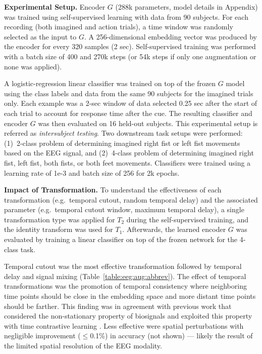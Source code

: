 \documentclass{article}
\renewcommand{\paragraph}[1]{\textbf{#1}\hspace{1em}}
\begin{document}
\paragraph{Experimental Setup.} Encoder $G$ (288k parameters, model details in
Appendix) was trained using self-supervised learning with data from 90 subjects.
For each recording (both imagined and action trials), a time window was randomly
selected as the input to $G$. A 256-dimensional embedding vector was produced by
the encoder for every 320 samples (2 sec). Self-supervised training was
performed with a batch size of 400 and 270k steps (or 54k steps if only one
augmentation or none was applied).

A logistic-regression linear classifier was trained on top of the frozen $G$
model using the class labels and data from the same 90 subjects for the imagined
trials only. Each example was a 2-sec window of data selected 0.25 sec after the
start of each trial to account for response time after the cue. The resulting
classifier and encoder $G$ was then evaluated on 16 held-out subjects. This
experimental setup is referred as \textit{intersubject testing}. Two downstream
task setups were performed: (1)~2-class problem of determining imagined right
fist or left fist movements based on the EEG signal, and (2)~4-class problem of
determining imagined right fist, left fist, both fists, or both feet movements.
Classifiers were trained using a learning rate of 1e-3 and batch size of 256 for
2k epochs.

\paragraph{Impact of Transformation.}
To understand the effectiveness of each transformation (e.g.~temporal cutout,
random temporal delay) and the associated parameter (e.g.~temporal cutout
window, maximum temporal delay), a single transformation type was applied for
$T_2$ during the self-supervised training, and the identity transform was used
for $T_1$. Afterwards, the learned encoder $G$ was evaluated by training a
linear classifier on top of the frozen network for the 4-class task.

Temporal cutout was the most effective transformation followed by temporal delay
and signal mixing (Table~\ref{table:eeg:aug:abbrev}). The effect of temporal
transformations was the promotion of temporal consistency where neighboring time
points should be close in the embedding space and more distant time points
should be farther. This finding was in agreement with previous work that
considered the non-stationary property of biosignals and exploited this property
with time contrastive learning \cite{hyvarinen_unsupervised_2016}.
Less effective were spatial perturbations with negligible improvement
($\leq$0.1\%) in accuracy (not shown) --- likely the result of the limited
spatial resolution of the EEG modality.
\end{document}
